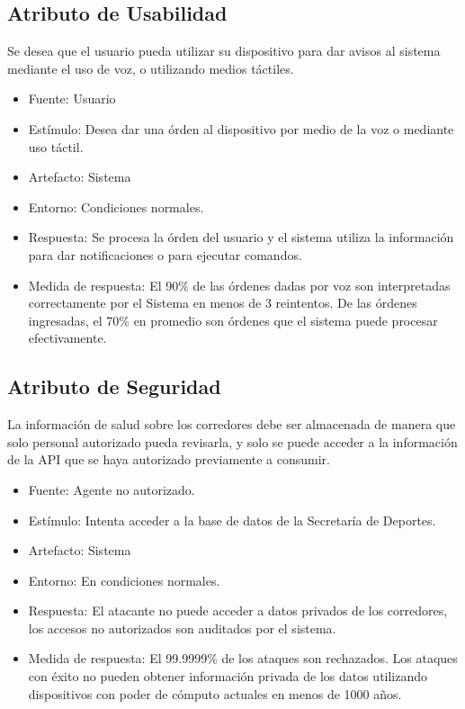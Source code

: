\subsection{Atributo de Usabilidad}

Se desea que el usuario pueda utilizar su dispositivo para dar avisos al
sistema mediante el uso de voz, o utilizando medios táctiles.

\begin{itemize}
\itemsep1pt\parskip0pt
\item
  Fuente: Usuario
\item
  Estímulo: Desea dar una órden al dispositivo por medio de la voz o
  mediante uso táctil.
\item
  Artefacto: Sistema
\item
  Entorno: Condiciones normales.
\item
  Respuesta: Se procesa la órden del usuario y el sistema utiliza la
  información para dar notificaciones o para ejecutar comandos.
\item
  Medida de respuesta: El 90\% de las órdenes dadas por voz son
  interpretadas correctamente por el Sistema en menos de 3 reintentos.
  De las órdenes ingresadas, el 70\% en promedio son órdenes que el
  sistema puede procesar efectivamente.
\end{itemize}

\subsection{Atributo de Seguridad}

La información de salud sobre los corredores debe ser almacenada de
manera que solo personal autorizado pueda revisarla, y solo se puede
acceder a la información de la API que se haya autorizado previamente a
consumir.

\begin{itemize}
\itemsep1pt\parskip0pt
\item
  Fuente: Agente no autorizado.
\item
  Estímulo: Intenta acceder a la base de datos de la Secretaría de
  Deportes.
\item
  Artefacto: Sistema
\item
  Entorno: En condiciones normales.
\item
  Respuesta: El atacante no puede acceder a datos privados de los
  corredores, los accesos no autorizados son auditados por el sistema.
\item
  Medida de respuesta: El 99.9999\% de los ataques son rechazados. Los
  ataques con éxito no pueden obtener información privada de los datos
  utilizando dispositivos con poder de cómputo actuales en menos de 1000
  años.
\end{itemize}

